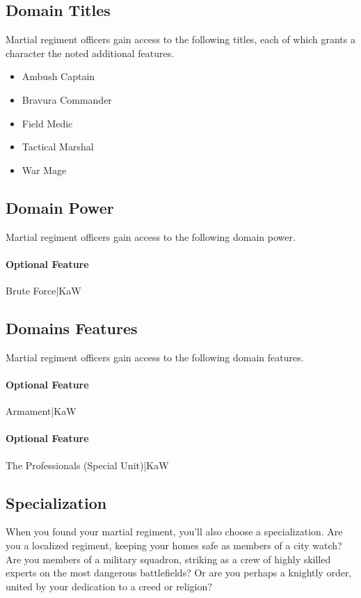 \documentclass[10pt,a4paper,twoside,bg=print,twocolumn,openany,nodeprecatedcode]{dndbook}
\begin{document}
\subsection{Domain Titles}
Martial regiment officers gain access to the following titles, each of which grants a character the noted additional features.


\begin{itemize}
\item Ambush Captain
\item Bravura Commander
\item Field Medic
\item Tactical Marshal
\item War Mage
\end{itemize}

\subsection{Domain Power}
Martial regiment officers gain access to the following domain power.

\paragraph{Optional Feature}
Brute Force|KaW

\subsection{Domains Features}
Martial regiment officers gain access to the following domain features.

\paragraph{Optional Feature}
Armament|KaW

\paragraph{Optional Feature}
The Professionals (Special Unit)|KaW

\subsection{Specialization}
When you found your martial regiment, you'll also choose a specialization. Are you a localized regiment, keeping your homes safe as members of a city watch? Are you members of a military squadron, striking as a crew of highly skilled experts on the most dangerous battlefields? Or are you perhaps a knightly order, united by your dedication to a creed or religion?
\end{document}
